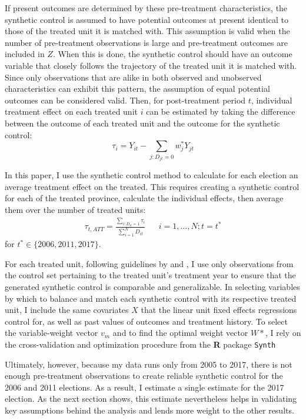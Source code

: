 \documentclass[12pt]{article}\usepackage[]{graphicx}\usepackage[]{color}
\newcommand{\1}{\mathbbm{1}}
\newcommand{\R}{\textbf{R} }
\newcommand{\Rcmd}[1]{{\large \texttt{#1}}}
\begin{document}
If present outcomes are determined by these pre-treatment characteristics, the synthetic control is assumed to have potential outcomes at present identical to those of the treated unit it is matched with. This assumption is valid when the number of pre-treatment observations is large and pre-treatment outcomes are included in $Z$. When this is done, the synthetic control should have an outcome variable that closely follows the trajectory of the treated unit it is matched with. Since only observations that are alike in both observed and unobserved characteristics can exhibit this pattern, the assumption of equal potential outcomes can be considered valid. Then, for post-treatment period $t$, individual treatment effect on each treated unit $i$ can be estimated by taking the difference between the outcome of each treated unit and the outcome for the synthetic control:
$$
	\tau_i = Y_{it} - \sum_{j:D_{jt}=0}w_j^*Y_{jt}
$$

In this paper, I use the synthetic control method to calculate for each election an average treatment effect on the treated. This requires creating a synthetic control for each of the treated province, calculate the individual effects, then average them over the number of treated units:
\begin{align*}
	\tau_{t, ATT} = \frac{\sum_{i: D_{it}=1} \tau_i}{\sum_{i=1}^{N}D_{it}}  && i = 1,\dots,N; t = t^*
\end{align*}
for $t^* \in \{2006, 2011, 2017\}$. 

For each treated unit, following guidelines by \cite{Abadie2010} and \cite{Abadie2015}, I use only observations from the control set pertaining to the treated unit's treatment year to ensure that the generated synthetic control is comparable and generalizable. In selecting variables by which to balance and match each synthetic control with its respective treated unit, I include the same covariates $X$ that the linear unit fixed effects regressions control for, as well as past values of outcomes and treatment history. To select the variable-weight vector $v_m$ and to find the optimal weight vector $W*$, I rely on the cross-validation and optimization procedure from the \R package \Rcmd{Synth} \citep{AbadieSynth}

Ultimately, however, because my data runs only from 2005 to 2017, there is not enough pre-treatment observations to create reliable synthetic control for the 2006 and 2011 elections. As a result, I estimate a single estimate for the 2017 election. As the next section shows, this estimate nevertheless helps in validating key assumptions behind the analysis and lends more weight to the other results.
\end{document}
